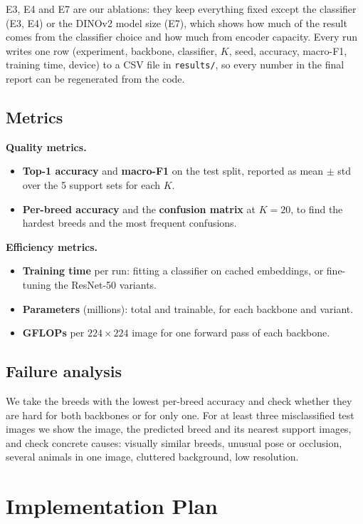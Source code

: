 \documentclass[11pt]{article}
\begin{document}
E3, E4 and E7 are our ablations: they keep everything fixed except the classifier
(E3, E4) or the DINOv2 model size (E7), which shows how much of the result comes from
the classifier choice and how much from encoder capacity.
Every run writes one row (experiment, backbone, classifier, $K$, seed, accuracy,
macro-F1, training time, device) to a CSV file in \texttt{results/}, so every
number in the final report can be regenerated from the code.

\subsection{Metrics}

\textbf{Quality metrics.}
\begin{itemize}
    \item \textbf{Top-1 accuracy} and \textbf{macro-F1} on the test split,
          reported as mean $\pm$ std over the 5 support sets for each $K$.
    \item \textbf{Per-breed accuracy} and the \textbf{confusion matrix} at $K=20$,
          to find the hardest breeds and the most frequent confusions.
\end{itemize}

\textbf{Efficiency metrics.}
\begin{itemize}
    \item \textbf{Training time} per run: fitting a classifier on cached
          embeddings, or fine-tuning the ResNet-50 variants.
    \item \textbf{Parameters} (millions): total and trainable, for each backbone and variant.
    \item \textbf{GFLOPs} per $224 \times 224$ image for one forward pass of each backbone.
\end{itemize}

\subsection{Failure analysis}

We take the breeds with the lowest per-breed accuracy and check whether they are
hard for both backbones or for only one. For at least three misclassified test
images we show the image, the predicted breed and its nearest support images,
and check concrete causes: visually similar breeds, unusual pose or occlusion,
several animals in one image, cluttered background, low resolution.

\section{Implementation Plan}
\end{document}
